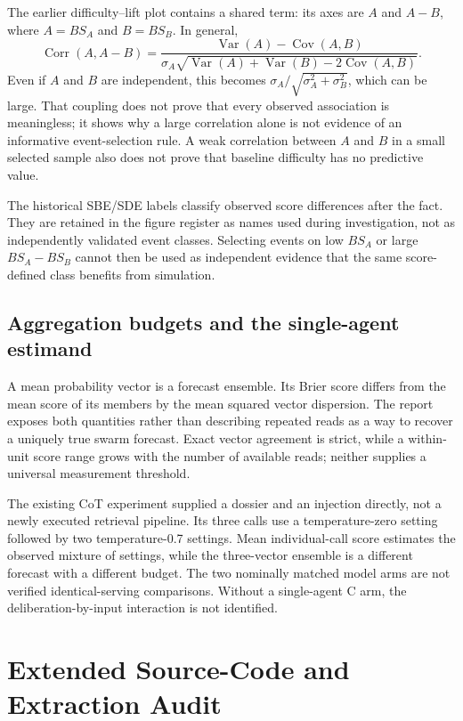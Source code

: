 The earlier difficulty--lift plot contains a shared term: its axes are $A$ and $A-B$, where $A=BS_A$ and $B=BS_B$. In general,
\[
\operatorname{Corr}(A,A-B)=
\frac{\operatorname{Var}(A)-\operatorname{Cov}(A,B)}
{\sigma_A\sqrt{\operatorname{Var}(A)+\operatorname{Var}(B)-2\operatorname{Cov}(A,B)}}.
\]
Even if $A$ and $B$ are independent, this becomes
$\sigma_A/\sqrt{\sigma_A^2+\sigma_B^2}$, which can be large.
That coupling does not prove that every observed association is meaningless; it shows why a large correlation alone is not evidence of an informative event-selection rule. A weak correlation between $A$ and $B$ in a small selected sample also does not prove that baseline difficulty has no predictive value.

The historical SBE/SDE labels classify observed score differences after the fact. They are retained in the figure register as names used during investigation, not as independently validated event classes. Selecting events on low $BS_A$ or large $BS_A-BS_B$ cannot then be used as independent evidence that the same score-defined class benefits from simulation.

\subsection{Aggregation budgets and the single-agent estimand}
A mean probability vector is a forecast ensemble. Its Brier score differs from the mean score of its members by the mean squared vector dispersion. The report exposes both quantities rather than describing repeated reads as a way to recover a uniquely true swarm forecast. Exact vector agreement is strict, while a within-unit score range grows with the number of available reads; neither supplies a universal measurement threshold.

The existing CoT experiment supplied a dossier and an injection directly, not a newly executed retrieval pipeline. Its three calls use a temperature-zero setting followed by two temperature-0.7 settings. Mean individual-call score estimates the observed mixture of settings, while the three-vector ensemble is a different forecast with a different budget. The two nominally matched model arms are not verified identical-serving comparisons. Without a single-agent C arm, the deliberation-by-input interaction is not identified.



\section{Extended Source-Code and Extraction Audit}
\label{sec:source_extended}
